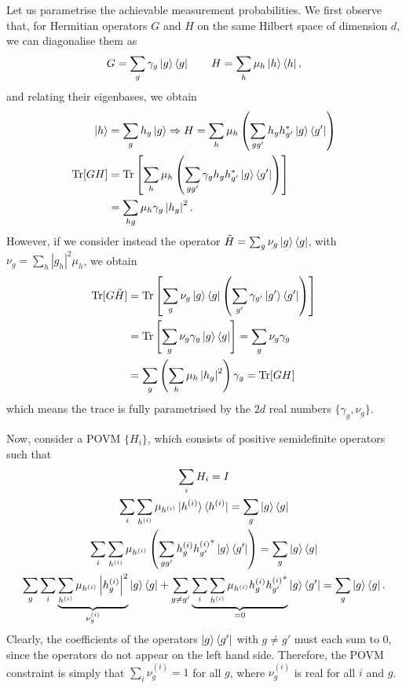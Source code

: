 \documentclass[10pt, a4paper]{article}
\numberwithin{equation}{section} %
\theoremstyle{definition}
\theoremstyle{plain}
\newcommand{\abs}[1]{\left\lvert#1\right\rvert}
\newcommand{\?}{\mathrel{?}} %
\newcommand{\Tr}{\mathrm{Tr}} %
\begin{document}
    Let us parametrise the achievable measurement probabilities. We first observe that, for Hermitian operators \(G\) and \(H\) on the same Hilbert space of dimension \(d\), we can diagonalise them as
    \[ G = \sum_g \gamma_g \ket{g}\bra{g} \qquad H = \sum_h \mu_h \ket{h}\bra{h}, \]
    and relating their eigenbases, we obtain
    \begin{align*}
      \ket{h} &= \sum_g h_g \ket{g} \Rightarrow H = \sum_h \mu_h \left(\sum_{gg'} h_g h_{g'}^* \ket{g}\bra{g'}\right) \\
      \Tr[GH] &= \Tr\left[ \sum_h \mu_h \left( \sum_{gg'} \gamma_g h_g h_{g'}^* \ket{g}\bra{g'} \right) \right] \\
      &= \sum_{hg} \mu_h \gamma_g \abs{h_g}^2.
    \end{align*}
    However, if we consider instead the operator \(\tilde{H} = \sum_g \nu_{g} \ket{g}\bra{g}\), with \(\nu_{g} = \sum_h \abs{g_h}^2 \mu_h\), we obtain
    \begin{align*}
      \Tr[G\tilde{H}] &= \Tr\left[ \sum_g \nu_{g} \ket{g}\bra{g} \left(\sum_{g'} \gamma_{g'} \ket{g'}\bra{g'} \right) \right] \\
      &= \Tr\left[ \sum_{g} \nu_{g}\gamma_{g}\ket{g}\bra{g} \right] = \sum_{g} \nu_{g}\gamma_{g} \\
      &= \sum_{g} \left(\sum_{h} \mu_h \abs{h_g}^2\right) \gamma_{g} = \Tr[GH]
    \end{align*}
    which means the trace is fully parametrised by the \(2d\) real numbers \(\{\gamma_g, \nu_{g}\}\).

    Now, consider a POVM \(\{H_i\}\), which consists of positive semidefinite operators such that
    \begin{gather*}
      \sum_i H_i = I \\
      \sum_i \sum_{h^{(i)}} \mu_{h^{(i)}} \ket{h^{(i)}}\bra{h^{(i)}} = \sum_g \ket{g}\bra{g} \\
      \sum_i \sum_{h^{(i)}} \mu_{h^{(i)}} \left(\sum_{gg'} h^{(i)}_g {h^{(i)}_{g'}}^* \ket{g}\bra{g'}\right) = \sum_g \ket{g}\bra{g} \\
      \sum_{g} \sum_i \underbrace{\sum_{h^{(i)}} \mu_{h^{(i)}} \abs{h^{(i)}_g}^2}_{\nu_g^{(i)}} \ket{g}\bra{g} + \sum_{g \neq g'} \underbrace{ \sum_i \sum_{h^{(i)}} \mu_{h^{(i)}} h^{(i)}_g {h^{(i)}_{g'}}^* }_{=0} \ket{g}\bra{g'} = \sum_g \ket{g}\bra{g}.
    \end{gather*}
    Clearly, the coefficients of the operators \(\ket{g}\bra{g'}\) with \(g \neq g'\) must each sum to 0, since the operators do not appear on the left hand side. Therefore, the POVM constraint is simply that \(\sum_i \nu_{g}^{(i)} = 1\) for all \(g\), where \(\nu_g^{(i)}\) is real for all \(i\) and \(g\).
\end{document}
